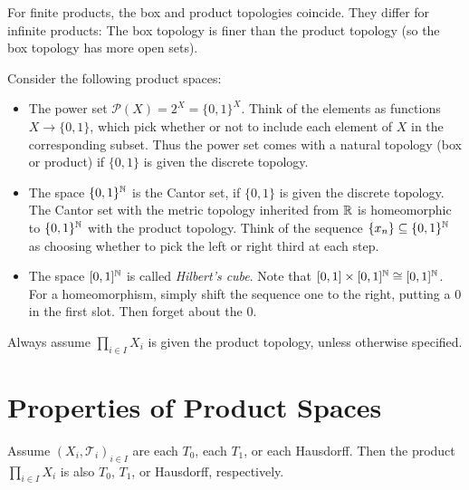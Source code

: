 \begin{remark}
  For finite products, the box and product
  topologies coincide. They differ for infinite
  products: The box topology is finer than the
  product topology (so the box topology has
  more open sets).
\end{remark}

\begin{example}
  Consider the following product spaces:
  \begin{itemize}
    \item The power set $\mathcal{P}(X) = 2^X = \{0, 1\}^X$.
      Think of the elements as functions
      $X \to \{0, 1\}$, which pick whether or not
      to include each element of $X$ in the
      corresponding subset. Thus the power set
      comes with a natural topology (box or
      product) if $\{0, 1\}$
      is given the discrete topology.
    \item The space $\{0, 1\}^{\mathbb{N}}$ is the
      Cantor set, if $\{0, 1\}$ is given the
      discrete topology. The Cantor set with
      the metric topology inherited from $\mathbb{R}$ is
      homeomorphic to $\{0, 1\}^{\mathbb{N}}$ with the product
      topology. Think of the sequence $\{x_n\} \subseteq \{0, 1\}^{\mathbb{N}}$
      as choosing whether to pick the left or right
      third at each step.
    \item The space $[0, 1]^{\mathbb{N}}$ is called
      \emph{Hilbert's cube}. Note that
      $[0, 1] \times [0, 1]^{\mathbb{N}} \cong [0, 1]^{\mathbb{N}}$.
      For a homeomorphism, simply shift the sequence
      one to
      the right, putting a $0$ in the first slot.
      Then forget about the $0$.
  \end{itemize}
\end{example}

\begin{remark}
  Always assume $\prod_{i \in I} X_i$ is given
  the product topology, unless otherwise specified.
\end{remark}

\section{Properties of Product Spaces}
\begin{theorem}
  Assume $(X_i, \mathcal{T}_i)_{i \in I}$ are each
  $T_0$, each $T_1$, or each Hausdorff. Then the
  product
  $\prod_{i \in I} X_i$ is also $T_0$, $T_1$,
  or Hausdorff, respectively.
\end{theorem}

